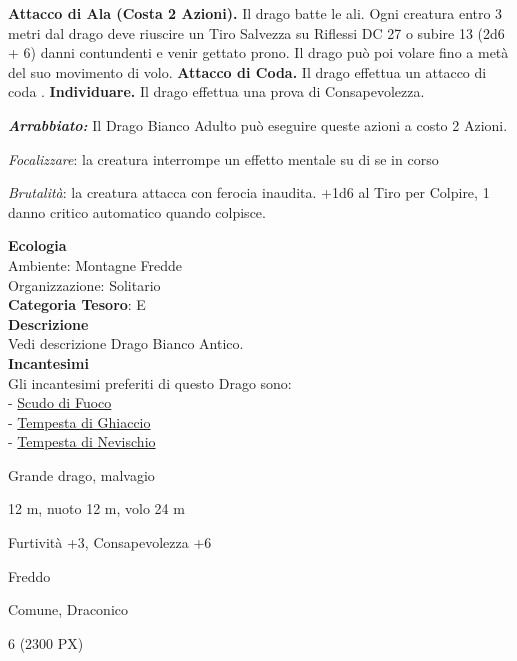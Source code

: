 \begin{multicols}{2}
{\textbf{Attacco di Ala (Costa 2 Azioni).} Il drago batte le ali. Ogni creatura entro 3 metri dal drago deve riuscire un Tiro Salvezza su Riflessi DC 27 o subire 13 (2d6 + 6) danni contundenti e venir gettato prono. Il drago può poi volare fino a metà del suo movimento di volo. \textbf{Attacco di Coda.} Il drago effettua un attacco di coda
.
\textbf{Individuare.} Il drago effettua una prova di Consapevolezza.

\emph{\textbf{Arrabbiato:}} Il Drago Bianco Adulto può eseguire queste azioni a costo 2 Azioni.

\emph{Focalizzare}: la creatura interrompe un effetto mentale su di se in corso

\emph{Brutalità}: la creatura attacca con ferocia inaudita. +1d6 al Tiro per Colpire, 1 danno critico automatico quando colpisce.

\textbf{Ecologia}\\
Ambiente: Montagne Fredde\\
Organizzazione: Solitario\\
\textbf{Categoria Tesoro}: E\\
\textbf{Descrizione}\\
Vedi descrizione Drago Bianco Antico.\\
\textbf{Incantesimi}\\
Gli incantesimi preferiti di questo Drago sono:\\
- \hyperlink{Scudo di Fuoco}{Scudo di Fuoco}\\
- \hyperlink{Tempesta di Ghiaccio}{Tempesta di Ghiaccio}\\
- \hyperlink{Tempesta di Nevischio}{Tempesta di Nevischio}

\begin{description}[noitemsep, topsep=0pt, parsep=0pt, partopsep=0pt, itemsep=1pt, leftmargin=2.35cm,  labelwidth=2.2cm, itemindent=0cm, listparindent=0pt] %
\setlength{\baselineskip}{10pt}
\item[\textbf{Taglia/Tipo}] Grande drago, malvagio
\item[\textbf{Caratt.}] 
\item[\textbf{Punti Ferita}] 
\item[\textbf{Movimento}] 12 m, nuoto 12 m, volo 24 m
\item[\textbf{Tiri Salvez.}] 
\item[\textbf{Comp.}] Furtività +3, Consapevolezza +6
\item[\textbf{Imm. Danni}] Freddo
\item[\textbf{Sensi}] 
\item[\textbf{Linguaggi}] Comune, Draconico
\item[\textbf{Sfida}] 6 (2300 PX)
\end{description}
\smallskip

}
\end{multicols}
